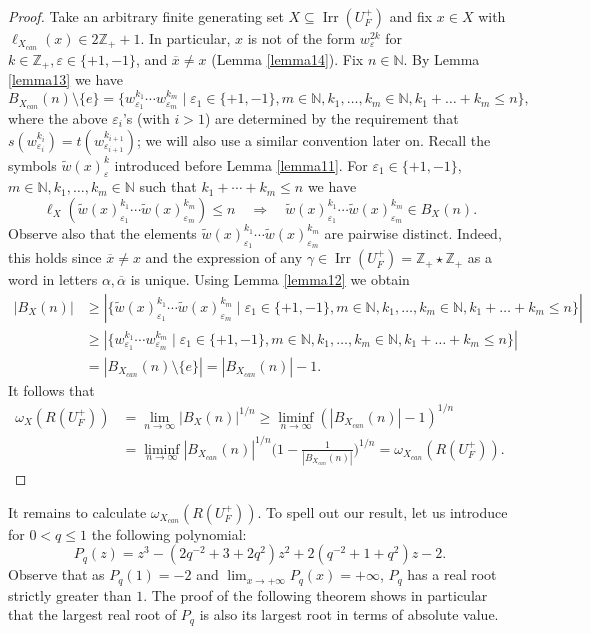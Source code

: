 \documentclass[11 pt, leqno]{amsart}
\newcommand{\eps}{\varepsilon}
\newcommand{\ov}{\overline}
\newcommand{\NN}{\mathbb{N}}
\newcommand{\ZZ}{\mathbb{Z}}
\DeclareMathOperator{\Irr}{Irr}
\theoremstyle{definition}
\numberwithin{equation}{section}
\begin{document}
\begin{proof}
Take an arbitrary finite generating set $X\subseteq \Irr(U_F^+)$ and fix $x\in X$ with $\ell_{X_{can}}(x)\in 2\ZZ_+ +1$. In particular, $x$ is not of the form $w^{2k}_{\eps}$ for $k\in\ZZ_+,\eps\in \{+1,-1\}$, and $\ov{x}\neq x$ (Lemma \ref{lemma14}). Fix $n\in\NN$. By Lemma \ref{lemma13} we have
\[
B_{X_{can}}(n)\setminus\{e\}=\{ w^{k_1}_{\eps_1}\cdots 
w^{k_m}_{\eps_m} \mid 
\eps_1\in\{+1,-1\}, m\in\NN, k_1,\dotsc,k_m\in\NN ,k_1+\dotsc+k_m\le n\},
\]
where the above $\eps_{i}$'s (with $i>1$) are determined by the requirement that $s(w^{k_i}_{\eps_i})=t(w^{k_{i+1}}_{\eps_{i+1}})$; we will also use a similar convention later on. Recall the symbols $\widetilde{w}(x)^{k}_{\eps}$ introduced before Lemma \ref{lemma11}. For $\eps_1\in \{+1,-1\}$, $m\in\NN,k_1, \ldots, k_m \in \NN$ such that $ k_1+\cdots+k_m\le n$ we have 
\[
\ell_X(\widetilde{w}(x)^{k_1}_{\eps_1} 
\cdots
\widetilde{w}(x)^{k_m}_{\eps_m} )\le n \quad \Rightarrow\quad 
\widetilde{w}(x)^{k_1}_{\eps_1} 
\cdots
\widetilde{w}(x)^{k_m}_{\eps_m}\in B_X(n).
\]
Observe also that the elements $\widetilde{w}(x)^{k_1}_{\eps_1} \cdots \widetilde{w}(x)^{k_m}_{\eps_m} $ are pairwise distinct. Indeed, this holds since $\ov{x}\neq x$ and the expression of any $\gamma\in\Irr(U_F^+)=\ZZ_+\star\ZZ_+$ as a word in letters $\alpha,\ov\alpha$ is unique. Using Lemma \ref{lemma12} we obtain
\[\begin{split}
|B_X(n)| &\ge |\{
\widetilde{w}(x)^{k_1}_{\eps_1}\cdots 
\widetilde{w}(x)^{k_m}_{\eps_m} 
 \mid 
\eps_1\in \{+1,-1\},m\in\NN, k_1,\dotsc,k_m\in\NN, k_1+\dotsc+k_m\le n\}|\\
&\ge 
|\{w^{k_1}_{\eps_1}\cdots 
w^{k_m}_{\eps_m} 
 \mid 
\eps_1\in \{+1,-1\},m\in\NN, k_1,\dotsc,k_m\in\NN, k_1+\dotsc+k_m\le n\}|\\
&=
|B_{X_{can}}(n)\setminus \{e\}|=
|B_{X_{can}}(n)|-1.
\end{split}\]
It follows that
\begin{align*}
\omega_X(R(U_F^+))&=
\lim_{n\to\infty} |B_X(n)|^{1/n} \ge 
\liminf_{n\to\infty} (|B_{X_{can}}(n)|-1)^{1/n}\\
&=
\liminf_{n\to\infty} 
|B_{X_{can}}(n)|^{1/n}
\bigl(1-\tfrac{1}{|B_{X_{can}}(n)|}\bigr)^{1/n}=
\omega_{X_{can}}(R(U_F^+)).
\end{align*}
\end{proof}

It remains to calculate $\omega_{X_{can}}(R(U_F^+))$. To spell out our result, let us introduce for $0<q\le 1$ the following polynomial:
\begin{equation}\label{eq22}
P_q(z)=z^3- (2q^{-2} +3+2q^2)z^2 +2(q^{-2}+1+q^2)z -2.
\end{equation}
Observe that as $P_q(1)=-2$ and $\lim_{x\to +\infty}P_q(x)=+\infty$, $P_q$ has a real root strictly greater than $1$. %
The proof of the following theorem shows in particular that the largest real root of $P_q$ is also its largest root in terms of absolute value.%
\end{document}
